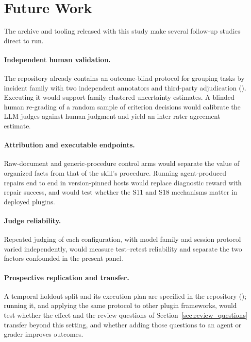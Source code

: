 \documentclass[11pt]{article}
\begin{document}
\section{Future Work}\label{sec:future}
The archive and tooling released with this study make several follow-up studies direct to run.

\paragraph{Independent human validation.} The repository already contains an outcome-blind protocol for grouping tasks by incident family with two independent annotators and third-party adjudication (). Executing it would support family-clustered uncertainty estimates. A blinded human re-grading of a random sample of criterion decisions would calibrate the LLM judges against human judgment and yield an inter-rater agreement estimate.

\paragraph{Attribution and executable endpoints.} Raw-document and generic-procedure control arms would separate the value of organized facts from that of the skill's procedure. Running agent-produced repairs end to end in version-pinned hosts would replace diagnostic reward with repair success, and would test whether the S11 and S18 mechanisms matter in deployed plugins.

\paragraph{Judge reliability.} Repeated judging of each configuration, with model family and session protocol varied independently, would measure test--retest reliability and separate the two factors confounded in the present panel.

\paragraph{Prospective replication and transfer.} A temporal-holdout split and its execution plan are specified in the repository (); running it, and applying the same protocol to other plugin frameworks, would test whether the effect and the review questions of Section~\ref{sec:review_questions} transfer beyond this setting, and whether adding those questions to an agent or grader improves outcomes.
\end{document}
